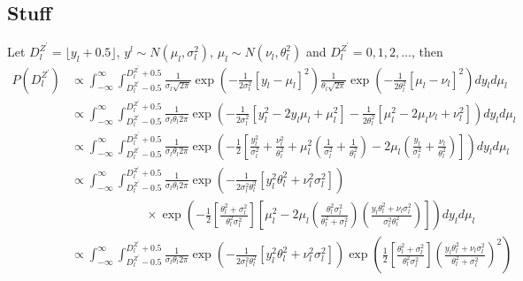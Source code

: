 \documentclass[a4paper]{article}
\begin{document}
\subsection{Stuff}

Let $D^{Z^\prime}_l = \lfloor y_l + 0.5 \rfloor$, $y^l \sim N\left(\mu_l, \sigma^2_l\right)$, $\mu_l \sim N\left(\nu_l, \theta^2_l\right)$ and $D^{Z^\prime}_l = 0, 1, 2, \dots$, then
\begin{align}
    P\left(D^{Z^\prime}_l\right) &\propto \int_{-\infty}^\infty \int_{D^{Z^\prime}_l - 0.5}^{D^{Z^\prime}_l + 0.5} \frac{1}{\sigma_l\sqrt{2\pi}} \exp\left(-\frac{1}{2\sigma^2_l}\left[y_l - \mu_l\right]^2\right)\frac{1}{\theta_l\sqrt{2\pi}} \exp\left(-\frac{1}{2\theta^2_l}\left[\mu_l - \nu_l\right]^2\right) dy_l d\mu_l\nonumber\\
    &\propto \int_{-\infty}^\infty \int_{D^{Z^\prime}_l - 0.5}^{D^{Z^\prime}_l + 0.5} \frac{1}{\sigma_l\theta_l 2\pi} \exp\left(-\frac{1}{2\sigma^2_l}\left[y^2_l - 2y_l\mu_l + \mu^2_l\right] - \frac{1}{2\theta^2_l}\left[\mu^2_l - 2\mu_l\nu_l + \nu^2_l\right]\right) dy_l d\mu_l\nonumber\\
    &\propto \int_{-\infty}^\infty \int_{D^{Z^\prime}_l - 0.5}^{D^{Z^\prime}_l + 0.5} \frac{1}{\sigma_l\theta_l 2\pi} \exp\left(-\frac{1}{2}\left[\frac{y^2_l}{\sigma^2_l} + \frac{\nu^2_l}{\theta^2_l} + \mu^2_l \left(\frac{1}{\sigma^2_l} + \frac{1}{\theta^2_l}\right) - 2\mu_l\left(\frac{y_l}{\sigma^2_l} + \frac{\nu_l}{\theta^2_l}\right)\right]\right) dy_l d\mu_l\nonumber\\
    &\propto \int_{-\infty}^\infty \int_{D^{Z^\prime}_l - 0.5}^{D^{Z^\prime}_l + 0.5} \frac{1}{\sigma_l\theta_l 2\pi} \exp\left(-\frac{1}{2\sigma^2_l\theta^2_l}\left[y^2_l\theta^2_l + \nu^2_l\sigma^2_l\right]\right)\nonumber\\
    & \qquad \qquad \qquad \times \exp\left(-\frac{1}{2}\left[\frac{\theta^2_l + \sigma^2_l}{\theta^2_l\sigma^2_l}\right]\left[\mu^2_l - 2\mu_l\left(\frac{\theta^2_l\sigma^2_l}{\theta^2_l + \sigma^2_l}\right)\left(\frac{y_l\theta^2_l + \nu_l\sigma^2_l}{\sigma^2_l\theta^2_l}\right)\right]\right) dy_l d\mu_l\nonumber\\
    &\propto \int_{-\infty}^\infty \int_{D^{Z^\prime}_l - 0.5}^{D^{Z^\prime}_l + 0.5} \frac{1}{\sigma_l\theta_l 2\pi} \exp\left(-\frac{1}{2\sigma^2_l\theta^2_l}\left[y^2_l\theta^2_l + \nu^2_l\sigma^2_l\right]\right)\exp\left(\frac{1}{2}\left[\frac{\theta^2_l + \sigma^2_l}{\theta^2_l\sigma^2_l}\right]\left(\frac{y_l\theta^2_l + \nu_l\sigma^2_l}{\theta^2_l + \sigma^2_l}\right)^2\right)\nonumber\\

\end{align}
\end{document}
